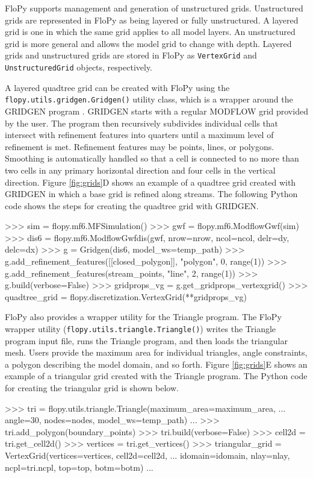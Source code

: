 \documentclass[11pt, oneside]{article}   	%
\begin{document}
FloPy supports management and generation of unstructured grids.  Unstructured grids are represented in FloPy as being layered or fully unstructured.  A layered grid is one in which the same grid applies to all model layers.  An unstructured grid is more general and allows the model grid to change with depth.  Layered grids and unstructured grids are stored in FloPy as \texttt{VertexGrid} and \texttt{UnstructuredGrid} objects, respectively.

A layered quadtree grid can be created with FloPy using the \texttt{flopy.utils.gridgen.Gridgen()} utility class, which is a wrapper around the GRIDGEN program \citep{gridgen}.  GRIDGEN starts with a regular MODFLOW grid provided by the user.  The program then recursively subdivides individual cells that intersect with refinement features into quarters until a maximum level of refinement is met.  Refinement features may be points, lines, or polygons.  Smoothing is automatically handled so that a cell is connected to no more than two cells in any primary horizontal direction and four cells in the vertical direction.   Figure \ref{fig:grids}D shows an example of a quadtree grid created with GRIDGEN in which a base grid is refined along streams.  The following Python code shows the steps for creating the quadtree grid with GRIDGEN.

\begin{python}
>>> sim = flopy.mf6.MFSimulation()
>>> gwf = flopy.mf6.ModflowGwf(sim)
>>> dis6 = flopy.mf6.ModflowGwfdis(gwf, nrow=nrow, ncol=ncol, delr=dy, delc=dx)
>>> g = Gridgen(dis6, model_ws=temp_path)
>>> g.add_refinement_features([[closed_polygon]], "polygon", 0, range(1))
>>> g.add_refinement_features(stream_points, "line", 2, range(1))
>>> g.build(verbose=False)
>>> gridprops_vg = g.get_gridprops_vertexgrid()
>>> quadtree_grid = flopy.discretization.VertexGrid(**gridprops_vg)
\end{python}

FloPy also provides a wrapper utility for the Triangle \citep{trianglemesh} program.  The FloPy wrapper utility (\texttt{flopy.utils.triangle.Triangle()}) writes the Triangle program input file, runs the Triangle program, and then loads the triangular mesh.  Users provide the maximum area for individual triangles, angle constraints, a polygon describing the model domain, and so forth.  Figure \ref{fig:grids}E shows an example of a triangular grid created with the Triangle program.  The Python code for creating the triangular grid is shown below.

\begin{python}
>>> tri = flopy.utils.triangle.Triangle(maximum_area=maximum_area,  
... angle=30, nodes=nodes, model_ws=temp_path)
...
>>> tri.add_polygon(boundary_points)
>>> tri.build(verbose=False)
>>> cell2d = tri.get_cell2d()
>>> vertices = tri.get_vertices()
>>> triangular_grid = VertexGrid(vertices=vertices, cell2d=cell2d, 
... idomain=idomain, nlay=nlay, ncpl=tri.ncpl, top=top, botm=botm)
...
\end{python}
\end{document}
